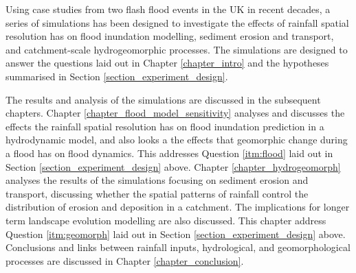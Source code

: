 Using case studies from two flash flood events in the UK in recent decades, a series of simulations has been designed to investigate the effects of rainfall spatial resolution has on flood inundation modelling, sediment erosion and transport, and catchment-scale hydrogeomorphic processes. The simulations are designed to answer the questions laid out in Chapter \ref{chapter_intro} and the hypotheses summarised in Section \ref{section_experiment_design}. 

The results and analysis of the simulations are discussed in the subsequent chapters. Chapter \ref{chapter_flood_model_sensitivity} analyses and discusses the effects the rainfall spatial resolution has on flood inundation prediction in a hydrodynamic model, and also looks a the effects that geomorphic change during a flood has on flood dynamics. This addresses Question \ref{itm:flood} laid out in Section \ref{section_experiment_design} above. Chapter \ref{chapter_hydrogeomorph} analyses the results of the simulations focusing on sediment erosion and transport, discussing whether the spatial patterns of rainfall control the distribution of erosion and deposition in a catchment. The implications for longer term landscape evolution modelling are also discussed. This chapter address Question \ref{itm:geomorph} laid out in Section \ref{section_experiment_design} above. Conclusions and links between rainfall inputs, hydrological, and geomorphological processes are discussed in Chapter \ref{chapter_conclusion}.

